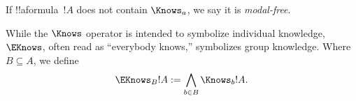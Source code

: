 \documentclass[../../../include/open-logic-section]{subfiles}
\begin{document}
If !!a{formula}~$!A$ does not contain $\Knows_a$, we say it
is \emph{modal-free}.

\begin{defn}
  While the $\Knows$ operator is intended to symbolize individual knowledge, $\EKnows$, often read as ``everybody knows,'' symbolizes group knowledge. Where $B \subseteq A$, we define $$\EKnows_B !A :=  \bigwedge_{b \in B} \Knows_b !A.$$
\end{defn}
\end{document}
